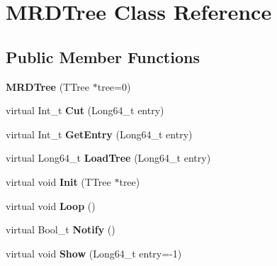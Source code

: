 \hypertarget{classMRDTree}{\section{M\-R\-D\-Tree Class Reference}
\label{classMRDTree}
}
\subsection*{Public Member Functions}
\begin{DoxyCompactItemize}
\item 
\hypertarget{classMRDTree_aeab336bcc0233f344b19f18cf879d65c}{{\bfseries M\-R\-D\-Tree} (T\-Tree $\ast$tree=0)}\label{classMRDTree_aeab336bcc0233f344b19f18cf879d65c}

\item 
\hypertarget{classMRDTree_acd47df243bbc678e2f06e63c83f2ddf9}{virtual Int\-\_\-t {\bfseries Cut} (Long64\-\_\-t entry)}\label{classMRDTree_acd47df243bbc678e2f06e63c83f2ddf9}

\item 
\hypertarget{classMRDTree_a6257cefb705d4ca769a2848e86a5af65}{virtual Int\-\_\-t {\bfseries Get\-Entry} (Long64\-\_\-t entry)}\label{classMRDTree_a6257cefb705d4ca769a2848e86a5af65}

\item 
\hypertarget{classMRDTree_a2d1700e816c336fd64c219557dce8afc}{virtual Long64\-\_\-t {\bfseries Load\-Tree} (Long64\-\_\-t entry)}\label{classMRDTree_a2d1700e816c336fd64c219557dce8afc}

\item 
\hypertarget{classMRDTree_a7cb7dca1c9b8484a88fe2aa75b326ec5}{virtual void {\bfseries Init} (T\-Tree $\ast$tree)}\label{classMRDTree_a7cb7dca1c9b8484a88fe2aa75b326ec5}

\item 
\hypertarget{classMRDTree_abf8580954488c13d66eed0dde60f96b4}{virtual void {\bfseries Loop} ()}\label{classMRDTree_abf8580954488c13d66eed0dde60f96b4}

\item 
\hypertarget{classMRDTree_a22230efd83c99f624e76b803391aed27}{virtual Bool\-\_\-t {\bfseries Notify} ()}\label{classMRDTree_a22230efd83c99f624e76b803391aed27}

\item 
\hypertarget{classMRDTree_a3f89baaa96b9e85827cc5c1471d0c8c4}{virtual void {\bfseries Show} (Long64\-\_\-t entry=-\/1)}\label{classMRDTree_a3f89baaa96b9e85827cc5c1471d0c8c4}

\end{DoxyCompactItemize}
